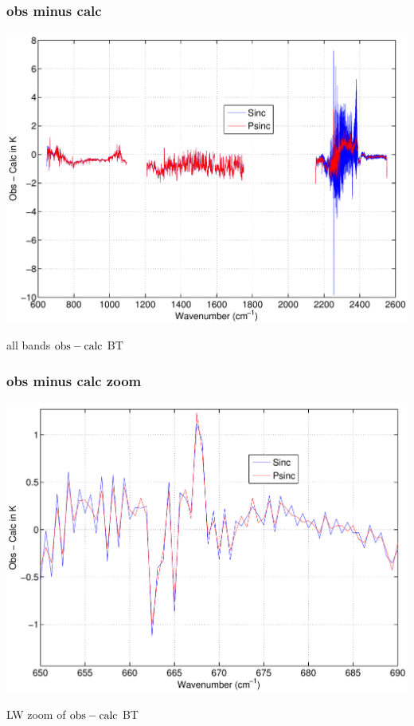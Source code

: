 \documentclass[11pt]{beamer}
\begin{document}
\begin{frame}
\frametitle{obs minus calc}

\begin{center}
  \includegraphics[scale=0.4]{strow_figs/bias_sinc_allnu.pdf}
\end{center}

all bands $\mbox{obs} - \mbox{calc}$ BT

\end{frame}
\begin{frame}
\frametitle{obs minus calc zoom}

\begin{center}
  \includegraphics[scale=0.4]{strow_figs/bias_sinc_longwave.pdf}
\end{center}

LW zoom of  $\mbox{obs} - \mbox{calc}$ BT

\end{frame}
\end{document}

